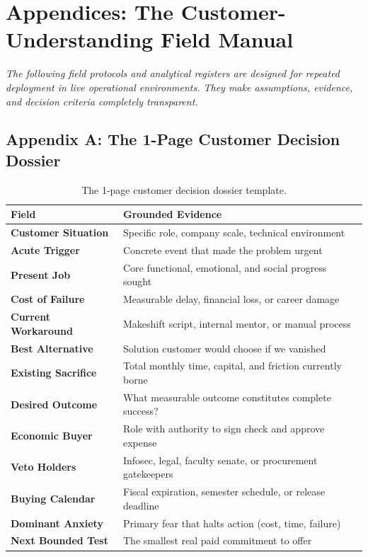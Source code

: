 \section*{Appendices: The Customer-Understanding Field Manual}

\noindent\textit{The following field protocols and analytical registers are designed for repeated deployment in live operational environments. They make assumptions, evidence, and decision criteria completely transparent.}

\subsection*{Appendix A: The 1-Page Customer Decision Dossier}

\begin{table}[h]
\centering
\small
\begin{tabularx}{\columnwidth}{>{\RaggedRight\bfseries}p{2.6cm} >{\RaggedRight}X}
\toprule
Field & Grounded Evidence \\
\midrule
Customer Situation & Specific role, company scale, technical environment \\
\addlinespace
Acute Trigger & Concrete event that made the problem urgent \\
\addlinespace
Present Job & Core functional, emotional, and social progress sought \\
\addlinespace
Cost of Failure & Measurable delay, financial loss, or career damage \\
\addlinespace
Current Workaround & Makeshift script, internal mentor, or manual process \\
\addlinespace
Best Alternative & Solution customer would choose if we vanished \\
\addlinespace
Existing Sacrifice & Total monthly time, capital, and friction currently borne \\
\addlinespace
Desired Outcome & What measurable outcome constitutes complete success? \\
\addlinespace
Economic Buyer & Role with authority to sign check and approve expense \\
\addlinespace
Veto Holders & Infosec, legal, faculty senate, or procurement gatekeepers \\
\addlinespace
Buying Calendar & Fiscal expiration, semester schedule, or release deadline \\
\addlinespace
Dominant Anxiety & Primary fear that halts action (cost, time, failure) \\
\addlinespace
Next Bounded Test & The smallest real paid commitment to offer \\
\bottomrule
\end{tabularx}
\caption{The 1-page customer decision dossier template.}
\label{tab:ch6_dossier_template}
\end{table}

